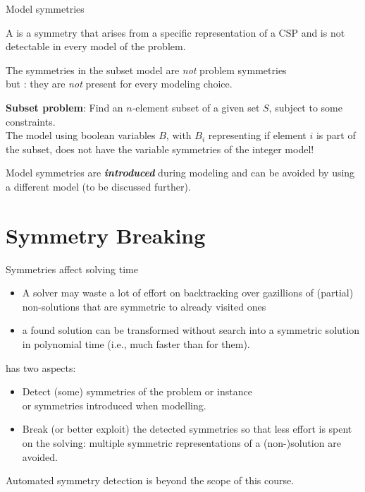 \documentclass{cons-beamer}
\begin{document}
\begin{frame}{Model symmetries}
  \begin{definition}
    A  is a symmetry that arises from a specific representation of a CSP and is not detectable in every model of the problem. 
  \end{definition}    
  \vfill

  The symmetries in the subset model are \emph{not} problem symmetries \\
  but : they are \emph{not} present for every modeling choice.
  

  \begin{example}
    \textbf{Subset problem}: Find an $n$-element subset of a given set $S$, subject to some constraints. \\[+5pt] The model using boolean variables $B$, with $B_i$ representing if element $i$ is part of the subset, does not have the variable symmetries of the integer model! 
  \end{example}
  \vfill
          
  Model symmetries are \textbf{\textit{introduced}} during modeling and can be avoided by using a different model (to be discussed further).
\end{frame}


\section{Symmetry Breaking}

\begin{frame}{Symmetries affect solving time}
  \vfill

  \begin{itemize}
    \item 
      A solver may waste a lot of effort on backtracking over
      gazillions of (partial) \alert{non-solutions} that are symmetric to already visited ones
      \vfill
    \item 
      a found \alert{solution} can
      be transformed without search into a symmetric solution in
      polynomial time (i.e., much faster than  for them).
  \end{itemize}
  \vfill

  \begin{block}{}
     has two aspects: \vfill
    \begin{itemize}
      \item {} Detect (some) symmetries of the problem or instance \\
        or symmetries introduced when modelling.
      \vfill
      \item {} Break (or better exploit) the
        detected symmetries so that less effort is spent on the
        solving: multiple symmetric representations of a (non-)solution are
        avoided.
    \end{itemize}
  \end{block}
  \vfill

  \alert{Automated symmetry detection is beyond the scope of this course.}
\end{frame}
\end{document}
